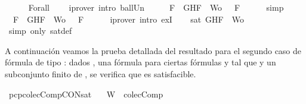 \begin{isabellebody}
\ \ \ \ \isamarkupfalse%
\ Forall{}\ {}\ {}\ \isamarkupfalse%
\ {\isacharparenleft}iprover\ intro{\isacharcolon}\ ball{\isacharunderscore}Un{\isacharparenright}\isanewline
\ \ \isamarkupfalse%
\ \isamarkupfalse%
\ {\isachardoublequoteopen}{\isasymforall}F\ {\isasymin}\ {\isacharparenleft}{\isacharbraceleft}G{\isacharcomma}H{\isacharcomma}F{\isacharbraceright}\ {\isasymunion}\ Wo{\isacharparenright}{\isachardot}\ {\isasymA}\ {\isasymTurnstile}\ F{\isachardoublequoteclose}\isanewline
\ \ \ \ \isamarkupfalse%
\ simp\isanewline
\ \ \isamarkupfalse%
\ \isamarkupfalse%
\ {\isachardoublequoteopen}{\isasymexists}{\isasymA}{\isachardot}\ {\isasymforall}F\ {\isasymin}\ {\isacharparenleft}{\isacharbraceleft}G{\isacharcomma}H{\isacharcomma}F{\isacharbraceright}\ {\isasymunion}\ Wo{\isacharparenright}{\isachardot}\ {\isasymA}\ {\isasymTurnstile}\ F{\isachardoublequoteclose}\isanewline
\ \ \ \ \isamarkupfalse%
\ {\isacharparenleft}iprover\ intro{\isacharcolon}\ exI{\isacharparenright}\isanewline
\ \ \isamarkupfalse%
\ {\isachardoublequoteopen}sat\ {\isacharparenleft}{\isacharbraceleft}G{\isacharcomma}H{\isacharcomma}F{\isacharbraceright}\ {\isasymunion}\ Wo{\isacharparenright}{\isachardoublequoteclose}\isanewline
\ \ \ \ \isamarkupfalse%
\ {\isacharparenleft}simp\ only{\isacharcolon}\ sat{\isacharunderscore}def{\isacharparenright}\isanewline
{}\isamarkupfalse%
%
\endisatagproof
{\isafoldproof}%
%
\isadelimproof
%
\endisadelimproof
%
\begin{isamarkuptext}%
A continuación veamos la prueba detallada del resultado para el segundo caso de fórmula de 
  tipo \isa{{\isasymalpha}}: dados , una fórmula  para ciertas fórmulas  y  tal que 
   y  un subconjunto finito de , se verifica que  es satisfacible.%
\end{isamarkuptext}\isamarkuptrue%
\isamarkupfalse%
\ pcp{\isacharunderscore}colecComp{\isacharunderscore}CON{\isacharunderscore}sat{}{\isacharcolon}\isanewline
\ \ \ {\isachardoublequoteopen}W\ {\isasymin}\ colecComp{\isachardoublequoteclose}\isanewline

\end{isabellebody}
